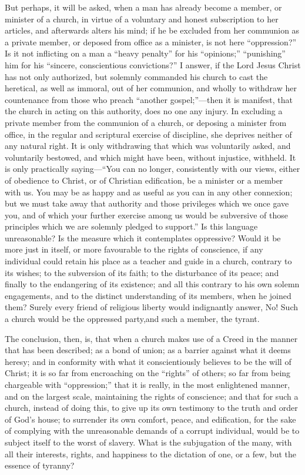\documentclass[
]{book}
\begin{document}
But perhaps, it will be asked, when a man has already become a member, or minister of a church, in virtue of a voluntary and honest subscription to her articles, and afterwards alters his mind; if he be excluded from her communion as a private member, or deposed from office as a minister, is not here ``oppression?'' Is it not inflicting on a man a ``heavy penalty'' for his ``opinions;'' ``punishing'' him for his ``sincere, conscientious convictions?'' I answer, if the Lord Jesus Christ has not only authorized, but solemnly commanded his church to cast the heretical, as well as immoral, out of her communion, and wholly to withdraw her countenance from those who preach ``another gospel;''---then it is manifest, that the church in acting on this authority, does no one any injury. In excluding a private member from the communion of a church, or deposing a minister from office, in the regular and scriptural exercise of discipline, she deprives neither of any natural right. It is only withdrawing that which was voluntarily asked, and voluntarily bestowed, and which might have been, without injustice, withheld. It is only practically saying---``You can no longer, consistently with our views, either of obedience to Christ, or of Christian edification, be a minister or a member with us. You may be as happy and as useful as you can in any other connexion; but we must take away that authority and those privileges which we once gave you, and of which your further exercise among us would be subversive of those principles which we are solemnly pledged to support.'' Is this language unreasonable? Is the measure which it contemplates oppressive? Would it be more just in itself, or more favourable to the rights of conscience, if any individual could retain his place as a teacher and guide in a church, contrary to its wishes; to the subversion of its faith; to the disturbance of its peace; and finally to the endangering of its existence; and all this contrary to his own solemn engagements, and to the distinct understanding of its members, when he joined them? Surely every friend of religious liberty would indignantly answer, No! Such a church would be the oppressed party,and such a member, the tyrant.

The conclusion, then, is, that when a church makes use of a Creed in the manner that has been described; as a bond of union; as a barrier against what it deems heresy; and in conformity with what it conscientiously believes to be the will of Christ; it is so far from encroaching on the ``rights'' of others; so far from being chargeable with ``oppression;'' that it is really, in the most enlightened manner, and on the largest scale, maintaining the rights of conscience; and that for such a church, instead of doing this, to give up its own testimony to the truth and order of God's house; to surrender its own comfort, peace, and edification, for the sake of complying with the unreasonable demands of a corrupt individual, would be to subject itself to the worst of slavery. What is the subjugation of the many, with all their interests, rights, and happiness to the dictation of one, or a few, but the essence of tyranny?
\end{document}
